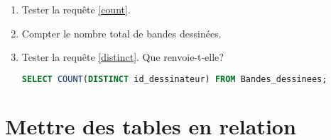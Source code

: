 \documentclass[svgnames,11pt]{beamer}
\begin{document}
\begin{frame}[fragile]
    \frametitle{}

\begin{activite}
\begin{enumerate}
\item Tester la requête \ref{count}.
\item Compter le nombre total de bandes dessinées.
\item Tester la requête \ref{distinct}. Que renvoie-t-elle?
\begin{center}
\begin{lstlisting}[language=SQL , basicstyle=\ttfamily\small, xleftmargin=1em, xrightmargin=0em]
SELECT COUNT(DISTINCT id_dessinateur) FROM Bandes_dessinees;
\end{lstlisting}
\label{distinct}
\end{center}
\end{enumerate}
\end{activite}

\end{frame}
\section{Mettre des tables en relation}
\end{document}

